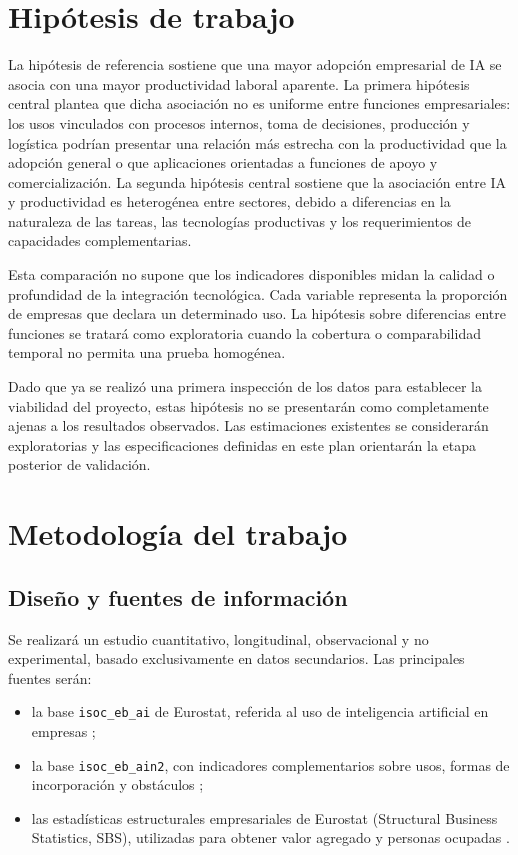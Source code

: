 \documentclass[12pt,a4paper]{article}
\begin{document}
\section{Hipótesis de trabajo}

La hipótesis de referencia sostiene que una mayor adopción empresarial de IA se asocia con una mayor productividad laboral aparente. La primera hipótesis central plantea que dicha asociación no es uniforme entre funciones empresariales: los usos vinculados con procesos internos, toma de decisiones, producción y logística podrían presentar una relación más estrecha con la productividad que la adopción general o que aplicaciones orientadas a funciones de apoyo y comercialización. La segunda hipótesis central sostiene que la asociación entre IA y productividad es heterogénea entre sectores, debido a diferencias en la naturaleza de las tareas, las tecnologías productivas y los requerimientos de capacidades complementarias.

Esta comparación no supone que los indicadores disponibles midan la calidad o profundidad de la integración tecnológica. Cada variable representa la proporción de empresas que declara un determinado uso. La hipótesis sobre diferencias entre funciones se tratará como exploratoria cuando la cobertura o comparabilidad temporal no permita una prueba homogénea.

Dado que ya se realizó una primera inspección de los datos para establecer la viabilidad del proyecto, estas hipótesis no se presentarán como completamente ajenas a los resultados observados. Las estimaciones existentes se considerarán exploratorias y las especificaciones definidas en este plan orientarán la etapa posterior de validación.

\section{Metodología del trabajo}

\subsection{Diseño y fuentes de información}

Se realizará un estudio cuantitativo, longitudinal, observacional y no experimental, basado exclusivamente en datos secundarios. Las principales fuentes serán:

\begin{itemize}
  \item la base \texttt{isoc\_eb\_ai} de Eurostat, referida al uso de inteligencia artificial en empresas \citep{eurostat_ai};
  \item la base \texttt{isoc\_eb\_ain2}, con indicadores complementarios sobre usos, formas de incorporación y obstáculos \citep{eurostat_ain2};
  \item las estadísticas estructurales empresariales de Eurostat (Structural Business Statistics, SBS), utilizadas para obtener valor agregado y personas ocupadas \citep{eurostat_sbs}.
\end{itemize}
\end{document}
